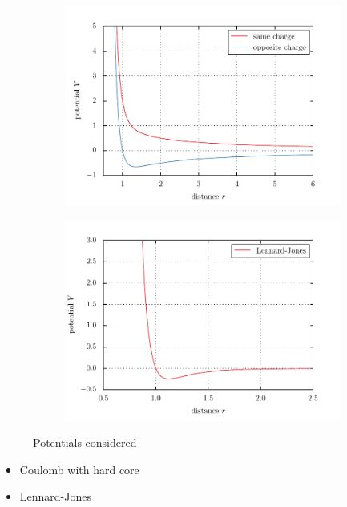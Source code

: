 \documentclass[11pt, a4paper]{article}
\numberwithin{equation}{section}
\begin{document}
\begin{figure}
	\begin{subfigure}{1.0\textwidth}
		\centering
		\includegraphics{./figures/potential_coulomb.pdf}
	\end{subfigure}
	\begin{subfigure}{1.0\textwidth}
		\centering
		\includegraphics{./figures/potential_lennard_jones.pdf}
	\end{subfigure}
	\caption{Potentials considered}	
\end{figure}

\begin{itemize}
	\item Coulomb with hard core
	\item Lennard-Jones
\end{itemize}
\end{document}
